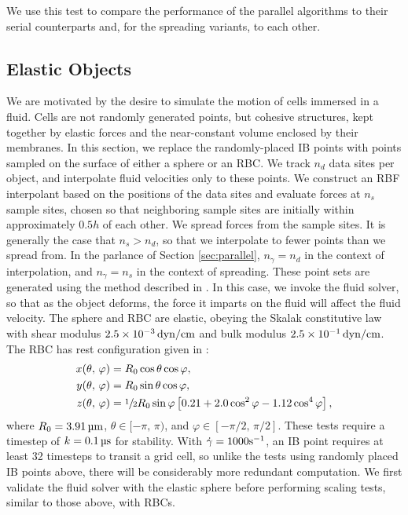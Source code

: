 We use this test to compare the performance of the parallel algorithms to their serial
counterparts and, for the spreading variants, to each other.





\subsection{Elastic Objects}

We are motivated by the desire to simulate the motion of cells immersed in a fluid. Cells
are not randomly generated points, but cohesive structures, kept together by elastic
forces and the near-constant volume enclosed by their membranes. In this section, we
replace the randomly-placed IB points with points sampled on the surface of either a
sphere or an RBC. We track $n_d$ data sites per object, and interpolate fluid velocities
only to these points. We construct an RBF interpolant based on the positions of the data
sites and evaluate forces at $n_s$ sample sites, chosen so that neighboring sample sites
are initially within approximately $0.5h$ of each other. We spread forces from the sample
sites. It is generally the case that $n_s > n_d$, so that we interpolate to fewer points
than we spread from. In the parlance of Section \ref{sec:parallel}, $n_\gamma=n_d$ in the
context of interpolation, and $n_\gamma=n_s$ in the context of spreading. These point
sets are generated using the method described in \cite{Shankar:2018ur}. In this case, we
invoke the fluid solver, so that as the object deforms, the force it imparts on the fluid
will affect the fluid velocity. The sphere and RBC are elastic, obeying the Skalak
constitutive law \cite{Skalak:1973tp} with shear modulus $2.5\times10^{-3}\dynpercm$ and
bulk modulus $2.5\times10^{-1}\dynpercm$. The RBC has rest configuration given in
\cite{Omori:2012hw}:
\begin{equation}
    \begin{aligned}
        x(\theta,\,\varphi) &= R_0\cos\theta\cos\varphi, \\
        y(\theta,\,\varphi) &= R_0\sin\theta\cos\varphi, \\
        z(\theta,\,\varphi) &= \sfrac12 R_0\sin\varphi\left[0.21 + 2.0 \cos^2\varphi -1.12 \cos^4\varphi\right],
    \end{aligned}
\end{equation}
where $R_0=3.91\um$, $\theta\in[-\pi,\,\pi)$, and $\varphi\in[-\pi/2,\,\pi/2]$. These
tests require a timestep of $k=0.1\us$ for stability. With $\dot{\gamma}=1000\si{\per\second}$,
an IB point requires at least 32 timesteps to transit a grid cell, so unlike the tests
using randomly placed IB points above, there will be considerably more redundant
computation. We first validate the fluid solver with the elastic sphere before performing
scaling tests, similar to those above, with RBCs.





